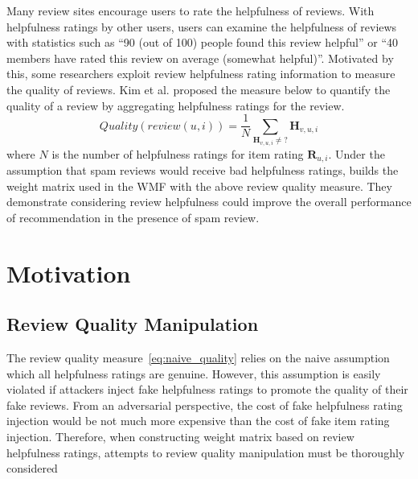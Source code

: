 \documentclass[master,english,final]{kaist-ucs}
\begin{document}
Many review sites encourage users to rate the helpfulness of reviews.
With helpfulness ratings by other users, users can examine the helpfulness of reviews with statistics such as “90 (out of 100) people found this review helpful” or “40 members have rated this review on average (somewhat helpful)”.
Motivated by this, some researchers \cite{naive_helpfulness,RQMF} exploit review helpfulness rating information to measure the quality of reviews.
Kim et al. \cite{naive_helpfulness} proposed the measure below to quantify the quality of a review by aggregating helpfulness ratings for the review.
\begin{equation} \label{eq:naive_quality}
Quality(review(u,i))=\frac{1} {N} \sum_{\bm{H}_{v,u,i} \neq ?} \bm{H}_{v,u,i}
\end{equation}
where $N$ is the number of helpfulness ratings for item rating $\bm{R}_{u,i}$.
Under the assumption that spam reviews would receive bad helpfulness ratings, \cite{RQMF} builds the weight matrix used in the WMF with the above review quality measure.
They demonstrate considering review helpfulness could improve the overall performance of recommendation in the presence of spam review.

\chapter{Motivation}
\section{Review Quality Manipulation}
The review quality measure~\ref{eq:naive_quality} relies on the naive assumption which all helpfulness ratings are genuine.
However, this assumption is easily violated if attackers inject fake helpfulness ratings to promote the quality of their fake reviews.
From an adversarial perspective, the cost of fake helpfulness rating injection would be not much more expensive than the cost of fake item rating injection.
Therefore, when constructing weight matrix based on review helpfulness ratings, attempts to review quality manipulation must be thoroughly considered
\end{document}
